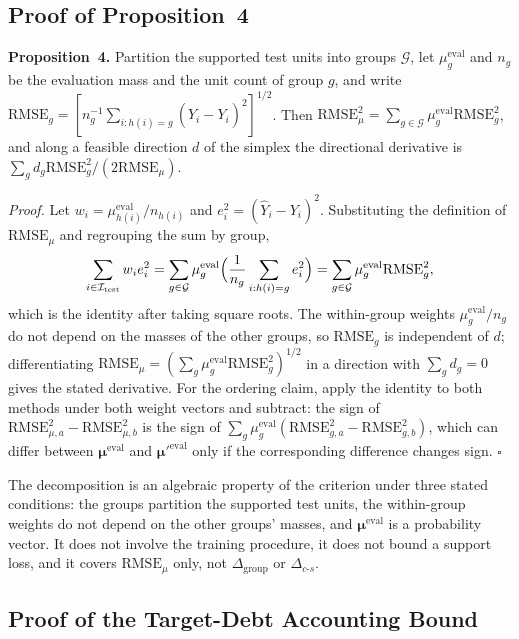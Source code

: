 \subsection{Proof of Proposition~4}
\label{app:proof_prop4}

\noindent\textbf{Proposition~4.}  Partition the supported test units into groups
$\mathcal G$, let $\mu^{\mathrm{eval}}_g$ and $n_g$ be the evaluation mass and
the unit count of group $g$, and write
$\mathrm{RMSE}_g=[n_g^{-1}\sum_{i:h(i)=g}(\widehat Y_i-Y_i)^2]^{1/2}$.  Then
$\mathrm{RMSE}_{\mu}^2=\sum_{g\in\mathcal G}\mu^{\mathrm{eval}}_g\mathrm{RMSE}_g^2$,
and along a feasible direction $d$ of the simplex the directional derivative is
$\sum_g d_g\mathrm{RMSE}_g^2/(2\mathrm{RMSE}_{\mu})$.

\emph{Proof.}  Let $w_i=\mu^{\mathrm{eval}}_{h(i)}/n_{h(i)}$ and
$e_i^2=(\widehat Y_i-Y_i)^2$.  Substituting the definition of
$\mathrm{RMSE}_{\mu}$ and regrouping the sum by group,
\[
 \sum_{i\in\mathcal I_{\mathrm{test}}}w_ie_i^2
 =\sum_{g\in\mathcal G}\mu^{\mathrm{eval}}_g
   \Bigl(\frac1{n_g}\sum_{i:h(i)=g}e_i^2\Bigr)
 =\sum_{g\in\mathcal G}\mu^{\mathrm{eval}}_g\mathrm{RMSE}_g^2 ,
\]
which is the identity after taking square roots.  The within-group weights
$\mu^{\mathrm{eval}}_g/n_g$ do not depend on the masses of the other groups, so
$\mathrm{RMSE}_g$ is independent of $d$; differentiating
$\mathrm{RMSE}_{\mu}=(\sum_g\mu^{\mathrm{eval}}_g\mathrm{RMSE}_g^2)^{1/2}$ in a
direction with $\sum_gd_g=0$ gives the stated derivative.  For the ordering
claim, apply the identity to both methods under both weight vectors and
subtract: the sign of
$\mathrm{RMSE}_{\mu,a}^2-\mathrm{RMSE}_{\mu,b}^2$ is the sign of
$\sum_g\mu^{\mathrm{eval}}_g(\mathrm{RMSE}_{g,a}^2-\mathrm{RMSE}_{g,b}^2)$,
which can differ between $\boldsymbol\mu^{\mathrm{eval}}$ and
$\boldsymbol\mu'^{\mathrm{eval}}$ only if the corresponding difference changes
sign.
\hfill$\square$

The decomposition is an algebraic property of the criterion under three stated
conditions: the groups partition the supported test units, the within-group
weights do not depend on the other groups' masses, and
$\boldsymbol\mu^{\mathrm{eval}}$ is a probability vector.  It does not involve
the training procedure, it does not bound a support loss, and it covers
$\mathrm{RMSE}_{\mu}$ only, not $\Delta_{\mathrm{group}}$ or
$\Delta_{c\text{-}s}$.


\subsection{Proof of the Target-Debt Accounting Bound}
\label{app:proof_debt_bound}

